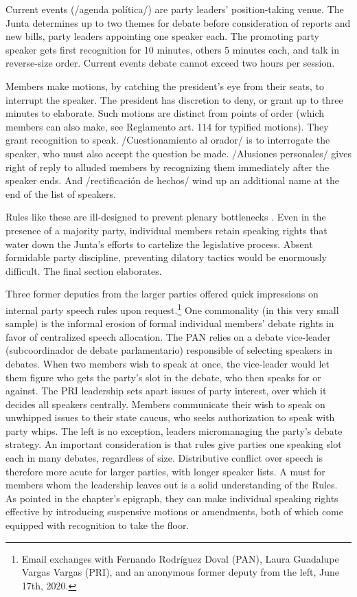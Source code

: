 \documentclass[letter,12pt]{article}
\begin{document}
Current events (/agenda política/) are party leaders' position-taking venue. The Junta determines up to two themes for debate before consideration of reports and new bills, party leaders appointing one speaker each. The promoting party speaker gets first recognition for 10 minutes, others 5 minutes each, and talk in reverse-size order. Current events debate cannot exceed two hours per session. 

Members make motions, by catching the president's eye from their seats, to interrupt the speaker. The president has discretion to deny, or grant up to three minutes to elaborate. Such motions are distinct from points of order (which members can also make, see Reglamento art. 114 for typified motions). They grant recognition to speak. /Cuestionamiento al orador/ is to interrogate the speaker, who must also accept the question be made. /Alusiones personales/ gives right of reply to alluded members by recognizing them immediately after the speaker ends. And /rectificación de hechos/ wind up an additional name at the end of the list of speakers. 

Rules like these are ill-designed to prevent plenary bottlenecks \citep{cox.2006}. Even in the presence of a majority party, individual members retain speaking rights that water down the Junta's efforts to cartelize the legislative process. Absent formidable party discipline, preventing dilatory tactics would be enormously difficult. The final section elaborates. 

Three former deputies from the larger parties offered quick impressions on internal party speech rules upon request.\footnote{Email exchanges with Fernando Rodríguez Doval (PAN), Laura Guadalupe Vargas Vargas (PRI), and an anonymous former deputy from the left, June 17th, 2020.} One commonality (in this very small sample) is the informal erosion of formal individual members' debate rights in favor of centralized speech allocation. The PAN relies on a debate vice-leader (subcoordinador de debate parlamentario) responsible of selecting speakers in debates. When two members wish to speak at once, the vice-leader would let them figure who gets the party's slot in the debate, who then speaks for or against. The PRI leadership sets apart issues of party interest, over which it decides all speakers centrally. Members communicate their wish to speak on unwhipped issues to their state caucus, who seeks authorization to speak with party whips. The left is no exception, leaders micromanaging the party's debate strategy. An important consideration is that rules give parties one speaking slot each in many debates, regardless of size. Distributive conflict over speech is therefore more acute for larger parties, with longer speaker lists. A must for members whom the leadership leaves out is a solid understanding of the Rules. As pointed in the chapter's epigraph, they can make individual speaking rights effective by introducing suspensive motions or amendments, both of which come equipped with recognition to take the floor. 
\end{document}
